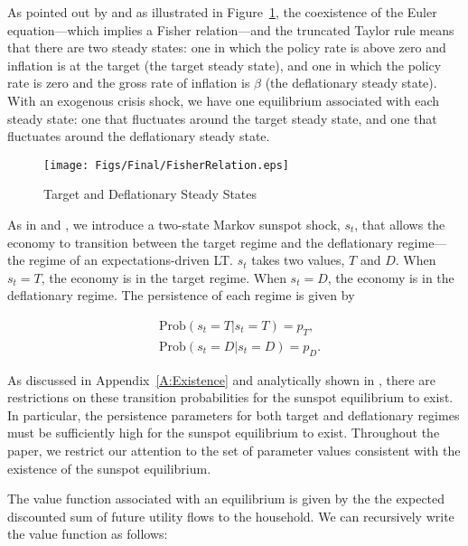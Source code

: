 \documentclass[11pt]{article}
\begin{document}
	As pointed out by \citet{BenhabibSchmittGroheUribe2002} and as illustrated in Figure~\ref{fig:FisherTaylor}, the coexistence of the Euler equation---which implies a Fisher relation---and the truncated Taylor rule means that there are two steady states: one in which the policy rate is above zero and inflation is at the target (the target steady state), and one in which the policy rate is zero and the gross rate of inflation is $\beta$ (the deflationary steady state). With an exogenous crisis shock, we have one equilibrium associated with each steady state: one that fluctuates around the target steady state, and one that fluctuates around the deflationary steady state. 
	
	\begin{figure}[!h]
		\begin{center}
			\caption{Target and Deflationary Steady States\label{fig:FisherTaylor}}
			\texttt{[image: Figs/Final/FisherRelation.eps]}\\
		\end{center}
	\end{figure}
	
	As in \citet{MertensRavn2014} and \citet{AruobaCubaBordaSchorfheide2018}, we introduce a two-state Markov sunspot shock, $s_{t}$, that allows the economy to transition between the target regime and the deflationary regime---the regime of an expectations-driven LT. $s_{t}$ takes two values, $T$ and $D$. When $s_{t}=T$, the economy is in the target regime. When $s_{t}=D$, the economy is in the deflationary regime. The persistence of each regime is given by
	
	\begin{align}
		& \text{Prob}(s_{t}=T|s_{t}=T)= p_{T},\\
		& \text{Prob}(s_{t}=D|s_{t}=D)= p_{D}.
	\end{align}
	
	\noindent As discussed in Appendix~\ref{A:Existence} and analytically shown in \citet{NakataSchmidt2019}, there are restrictions on these transition probabilities for the sunspot equilibrium to exist. In particular, the persistence parameters for both target and deflationary regimes must be sufficiently high for the sunspot equilibrium to exist. Throughout the paper, we restrict our attention to the set of parameter values consistent with the existence of the sunspot equilibrium.  
	
	The value function associated with an equilibrium is given by the the expected discounted sum of future utility flows to the household. We can recursively write the value function as follows:
	
\end{document}
